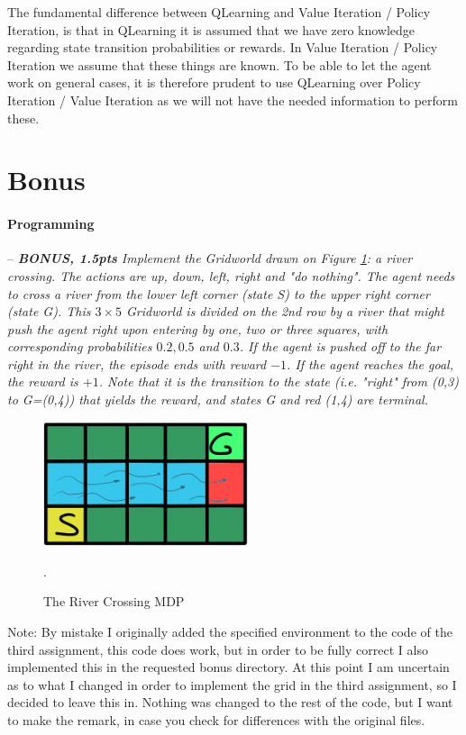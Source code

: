 \documentclass[a4paper]{article}
\newcommand{\programming}[1]{
\paragraph{Programming} -- \textit{#1}

}
\begin{document}
The fundamental difference between QLearning and Value Iteration / Policy Iteration, is that in QLearning it is assumed that we have zero knowledge regarding state transition probabilities or rewards. In Value Iteration / Policy Iteration we assume that these things are known. To be able to let the agent work on general cases, it is therefore prudent to use QLearning over Policy Iteration / Value Iteration as we will not have the needed information to perform these.

\section{Bonus}
\programming{\textbf{BONUS, 1.5pts} Implement the Gridworld drawn on Figure \ref{fig:river_crossing}: a river crossing. The actions are up, down, left, right and "do nothing". The agent needs to cross a river from the lower left corner (state S) to the upper right corner (state G). This $3\times 5$ Gridworld is divided on the 2nd row by a river that might push the agent right upon entering by one, two or three squares, with corresponding probabilities $0.2, 0.5$ and $0.3$. If the agent is pushed off to the far right in the river, the episode ends with reward $-1$. If the agent reaches the goal, the reward is $+1$. Note that it is the transition to the state (i.e. "right" from (0,3) to G=(0,4)) that yields the reward, and states G and red (1,4) are terminal. }

\begin{figure}[H]
    \centering
    \includegraphics[width=6cm]{plots/river.png}
    \caption{The River Crossing MDP}.
    \label{fig:river_crossing}
\end{figure}{}

Note: By mistake I originally added the specified environment to the code of the third assignment, this code does work, but in order to be fully correct I also implemented this in the requested bonus directory. At this point I am uncertain as to what I changed in order to implement the grid in the third assignment, so I decided to leave this in. Nothing was changed to the rest of the code, but I want to make the remark, in case you check for differences with the original files.


\printbibliography
\end{document}
